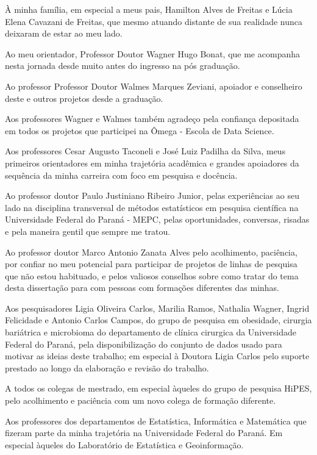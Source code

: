 \begin{agradece}	%

À minha família, em especial a meus pais, Hamilton Alves de Freitas e Lúcia Elena Cavazani de Freitas, que mesmo atuando distante de sua realidade nunca deixaram de estar ao meu lado.

Ao meu orientador, Professor Doutor Wagner Hugo Bonat, que me acompanha nesta jornada desde muito antes do ingresso na pós graduação.

Ao professor Professor Doutor Walmes Marques Zeviani, apoiador e conselheiro deste e outros projetos desde a graduação.

Aos professores Wagner e Walmes também agradeço pela confiança depositada em todos os projetos que participei na Ômega - Escola de Data Science.

Aos professores Cesar Augusto Taconeli e José Luiz Padilha da Silva, meus primeiros orientadores em minha trajetória acadêmica e grandes apoiadores da sequência da minha carreira com foco em pesquisa e docência.

Ao professor doutor Paulo Justiniano Ribeiro Junior, pelas experiências ao seu lado na disciplina transversal de métodos estatísticos em pesquisa científica na Universidade Federal do Paraná - MEPC, pelas oportunidades, conversas, risadas e pela maneira gentil que sempre me tratou.

Ao professor doutor Marco Antonio Zanata Alves pelo acolhimento, paciência, por confiar no meu potencial para participar de projetos de linhas de pesquisa que não estou habituado, e pelos valiosos conselhos sobre como tratar do tema desta dissertação para com pessoas com formações diferentes das minhas.

Aos pesquisadores Ligia Oliveira Carlos, Marilia Ramos, Nathalia Wagner, Ingrid Felicidade e Antonio Carlos Campos, do grupo de pesquisa em obesidade, cirurgia bariátrica e microbioma do departamento de clínica cirurgica da Universidade Federal do Paraná, pela disponibilização do conjunto de dados usado para motivar as ideias deste trabalho; em especial à Doutora Ligia Carlos pelo suporte prestado ao longo da elaboração e revisão do trabalho.

A todos os colegas de mestrado, em especial àqueles do grupo de pesquisa HiPES, pelo acolhimento e paciência com um novo colega de formação diferente.

Aos professores dos departamentos de Estatística, Informática e Matemática que fizeram parte da minha trajetória na Universidade Federal do Paraná. Em especial àqueles do Laboratório de Estatística e Geoinformação. 


\end{agradece}

